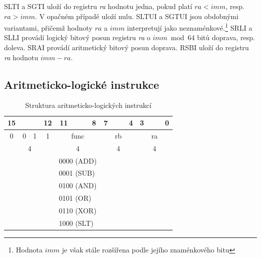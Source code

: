 \documentclass[
  digital, %
  color,   %
  table,   %
  twoside, %
  nolof,   %
  nolot,   %
]{fithesis3}
\begin{document}
SLTI a SGTI uloží do registru \textit{ra} hodnotu jedna, pokud platí $ra < imm$, resp. $ra > imm$. V opačném případě uloží nulu. SLTUI a SGTUI jsou obdobnými variantami, přičemž hodnoty $ra$ a $imm$ interpretují jako neznaménkové.\footnote{Hodnota $imm$ je však stále rozšířena podle jejího znaménkového bitu} SRLI a SLLI provádí logický bitový posun registru \textit{ra} o $imm \bmod 64$ bitů doprava, resp. doleva. SRAI provádí aritmetický bitový posun doprava. RSBI uloží do registru \textit{ra} hodnotu $imm - ra$.

\subsection{Aritmeticko-logické instrukce}
\begin{table}[H]
\caption{Struktura aritmeticko-logických instrukcí}
\begin{tabular}{lllllcccllllllll}
\multicolumn{1}{c}{15} & \multicolumn{1}{c}{} & \multicolumn{1}{c}{} & \multicolumn{1}{c}{12} & \multicolumn{1}{c}{11} &  &  & 8 & \multicolumn{1}{c}{7} & \multicolumn{1}{c}{} & \multicolumn{1}{c}{} & \multicolumn{1}{c}{4} & \multicolumn{1}{c}{3} & \multicolumn{1}{c}{} & \multicolumn{1}{c}{} & \multicolumn{1}{c}{0} \\ \hline
\multicolumn{1}{|c}{0} & \multicolumn{1}{c}{0} & \multicolumn{1}{c}{1} & \multicolumn{1}{c|}{1} & \multicolumn{4}{c|}{func} & \multicolumn{4}{c|}{rb} & \multicolumn{4}{c|}{ra} \\ \hline
\multicolumn{4}{c}{{\color[HTML]{656565} 4}} & \multicolumn{4}{c}{{\color[HTML]{656565} 4}} & \multicolumn{4}{c}{{\color[HTML]{656565} 4}} & \multicolumn{4}{c}{{\color[HTML]{656565} 4}} \\
 &  &  &  & \multicolumn{4}{l}{0000 (ADD)} &  &  &  &  &  &  &  &  \\
 &  &  &  & \multicolumn{4}{l}{0001 (SUB)} &  &  &  &  &  &  &  &  \\
 &  &  &  & \multicolumn{4}{l}{0100 (AND)} &  &  &  &  &  &  &  &  \\
 &  &  &  & \multicolumn{4}{l}{0101 (OR)} &  &  &  &  &  &  &  &  \\
\multicolumn{1}{c}{} & \multicolumn{1}{c}{} &  &  & \multicolumn{4}{l}{0110 (XOR)} & \multicolumn{1}{c}{} & \multicolumn{1}{c}{} & \multicolumn{1}{c}{} & \multicolumn{1}{c}{} & \multicolumn{1}{c}{} & \multicolumn{1}{c}{} & \multicolumn{1}{c}{} & \multicolumn{1}{c}{} \\
\multicolumn{1}{c}{} & \multicolumn{1}{c}{} &  &  & \multicolumn{4}{l}{1000 (SLT)} & \multicolumn{1}{c}{} & \multicolumn{1}{c}{} & \multicolumn{1}{c}{} & \multicolumn{1}{c}{} & \multicolumn{1}{c}{} & \multicolumn{1}{c}{} & \multicolumn{1}{c}{} & \multicolumn{1}{c}{} \\

\end{tabular}
\end{table}
\end{document}

